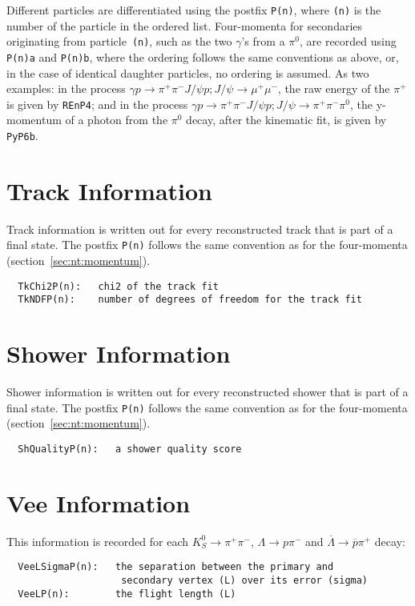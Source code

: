 \documentclass[11pt]{article}
\begin{document}
Different particles are differentiated using the postfix {\tt P(n)}, where {\tt (n)} is the number of the particle in the ordered list.  Four-momenta for secondaries originating from particle~{\tt (n)}, such as the two $\gamma$'s from a $\pi^0$, are recorded using {\tt P(n)a} and {\tt P(n)b}, where the ordering follows the same conventions as above, or, in the case of identical daughter particles, no ordering is assumed.  As two examples: in the process $\gamma p \to\pi^+\pi^-J/\psi p; J/\psi\to\mu^+\mu^-$, the raw energy of the $\pi^+$ is given by {\tt REnP4}; and in the process $\gamma p \to \pi^+\pi^-J/\psi p; J/\psi\to\pi^+\pi^-\pi^0$, the y-momentum of a photon from the $\pi^0$ decay, after the kinematic fit, is given by {\tt PyP6b}.




\section{Track Information}
\label{sec:nt:track}

Track information is written out for every reconstructed track that is part of a final state.  The postfix {\tt P(n)} follows the same convention as for the four-momenta (section~\ref{sec:nt:momentum}).
\begin{verbatim}
  TkChi2P(n):   chi2 of the track fit
  TkNDFP(n):    number of degrees of freedom for the track fit
\end{verbatim}


\section{Shower Information}
\label{sec:nt:shower}

Shower information is written out for every reconstructed shower that is part of a final state.  The postfix {\tt P(n)} follows the same convention as for the four-momenta (section~\ref{sec:nt:momentum}).
\begin{verbatim}
  ShQualityP(n):   a shower quality score
\end{verbatim}

\section{Vee Information}
\label{sec:nt:vee}

This information is recorded for each $K^0_S\to\pi^+\pi^-$, $\Lambda \to p\pi^-$ and $\overline{\Lambda}\to\overline{p}\pi^+$ decay:
\begin{verbatim}
  VeeLSigmaP(n):   the separation between the primary and
                    secondary vertex (L) over its error (sigma)
  VeeLP(n):        the flight length (L)
\end{verbatim}
\end{document}

